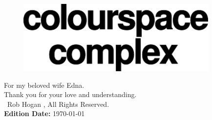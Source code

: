 
\thispagestyle{empty}%
\vspace*{\fill}
\begin{figure}[H]
    \centering
      \includegraphics[width=10cm]{src/cover/title_page_colorspace.png}%
\end{figure}
\vspace*{\fill}

\clearpage

\vspace*{\fill}
For my beloved wife Edna.\\
Thank you for your love and understanding.\\
\bigskip
\vspace*{\fill}
\textcopyright\ Rob Hogan \the\year{}, All Rights Reserved. \\
\textbf{Edition Date:} \today

\doclicenseThis
\clearpage
